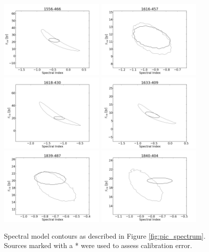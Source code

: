\documentclass[preprint]{aastex}
\begin{document}
\begin{figure}[htbp]
\begin{center}
\includegraphics[width=2in]{plots/1556-466_SI_MCMC.png} %
\includegraphics[width=2in]{plots/1616-457_SI_MCMC.png} %
\includegraphics[width=2in]{plots/1618-430_SI_MCMC.png} %
\includegraphics[width=2in]{plots/1633-409_SI_MCMC.png} %
\includegraphics[width=2in]{plots/1839-487_SI_MCMC.png} %
\includegraphics[width=2in]{plots/1840-404_SI_MCMC.png} %
\end{center}
\caption{Spectral model contours as described in Figure \ref{fig:pic_spectrum}. Sources marked with a
* were used to assess calibration error.
}\label{fig:SI_contour_3}
\end{figure}
\end{document}
